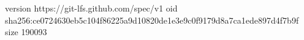 version https://git-lfs.github.com/spec/v1
oid sha256:ce0724630eb5c104f86225a9d10820de1e3e9c0f9179d8a7ca1ede897d4f7b9f
size 190093
